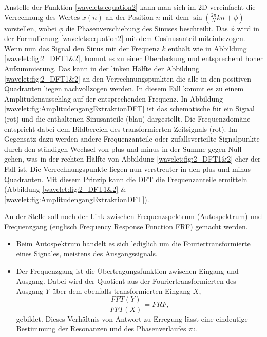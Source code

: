 Anstelle der Funktion \ref{wavelets:equation2} kann man sich im 2D vereinfacht die Verrechnung des Wertes $x(n)$ an der Position $n$ mit dem $\sin(\frac{2\pi}{N}kn+\phi)$ vorstellen, wobei $\phi$ die Phasenverschiebung des Sinuses beschreibt. Das $\phi$  wird in der Formulierung \ref{wavelets:equation2} mit dem Cosinusanteil miteinbezogen. Wenn nun das Signal den Sinus mit der Frequenz $k$ enthält wie in Abbildung \ref{wavelet:fig:2_DFT1&2}, kommt es zu einer Überdeckung und entsprechend hoher Aufsummierung. Das kann in der linken Hälfte der Abbildung \ref{wavelet:fig:2_DFT1&2} an den Verrechnungspunkten die alle in den positiven Quadranten liegen nachvollzogen werden. In diesem Fall kommt es zu einem Amplitudenausschlag auf der entsprechenden Frequenz. In Abbildung \ref{wavelet:fig:AmplitudengangExtraktionDFT} ist das schematische für ein Signal (rot) und die enthaltenen Sinusanteile (blau) dargestellt. Die Frequenzdomäne entspricht dabei dem Bildbereich des transformierten Zeitsignals (rot). Im Gegensatz dazu werden andere Frequenzanteile oder zufallsverteilte Signalpunkte durch den ständigen Wechsel von plus und minus in der Summe gegen Null gehen, was in der rechten Hälfte von Abbildung \ref{wavelet:fig:2_DFT1&2} eher der Fall ist. Die Verrechnungspunkte liegen nun verstreuter in den plus und minus Quadranten. Mit diesem Prinzip kann die DFT die Frequenzanteile ermitteln (Abbildung \ref{wavelet:fig:2_DFT1&2} \& \ref{wavelet:fig:AmplitudengangExtraktionDFT}).

An der Stelle soll noch der Link zwischen Frequenzspektrum (Autospektrum) und Frequenzgang (englisch Frequency Response Function FRF) gemacht werden.

\begin{itemize}
	\item Beim Autospektrum handelt es sich lediglich um die Fouriertransformierte eines Signales, meistens des Ausgangssignals.
	\item Der Frequenzgang ist die Übertragungsfunktion zwischen Eingang und Ausgang. Dabei wird der Quotient aus der Fouriertransformierten des Ausgang $Y$ über dem ebenfalls transformierten Eingang $X$, \[\frac{FFT(Y)}{FFT(X)} = FRF,\] gebildet.
	Dieses Verhältnis von Antwort zu Erregung lässt eine eindeutige Bestimmung der Resonanzen und des Phasenverlaufes zu.
\end{itemize}

